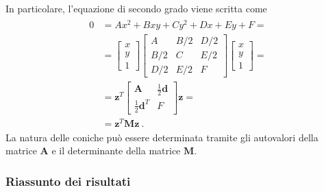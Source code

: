 \documentclass[letterpaper,10pt,italian]{jupyterBook}
\begin{document}
\sphinxAtStartPar
In particolare, l’equazione di secondo grado viene scritta come
\begin{equation*}
\begin{split}\begin{aligned}
0 
  & = A x^2 + B x y + C y^2 + D x + E y + F = \\
  & = \begin{bmatrix} x \\ y \\ 1 \end{bmatrix} \begin{bmatrix} A & B/2 & D/2 \\ B/2 & C & E/2 \\ D/2 & E/2 & F \end{bmatrix} \begin{bmatrix} x \\ y \\ 1 \end{bmatrix} = \\
  & = \mathbf{z}^T \begin{bmatrix} \mathbf{A} & \frac{1}{2}\mathbf{d} \\ \frac{1}{2} \mathbf{d}^T & F \end{bmatrix} \mathbf{z} = \\
  & = \mathbf{z}^T \mathbf{M} \mathbf{z} \ .
\end{aligned}\end{split}
\end{equation*}
\sphinxAtStartPar
La natura delle coniche può essere determinata tramite gli autovalori della matrice \(\mathbf{A}\) e il determinante della matrice \(\mathbf{M}\).
\subsubsection*{Riassunto dei risultati}
\end{document}
